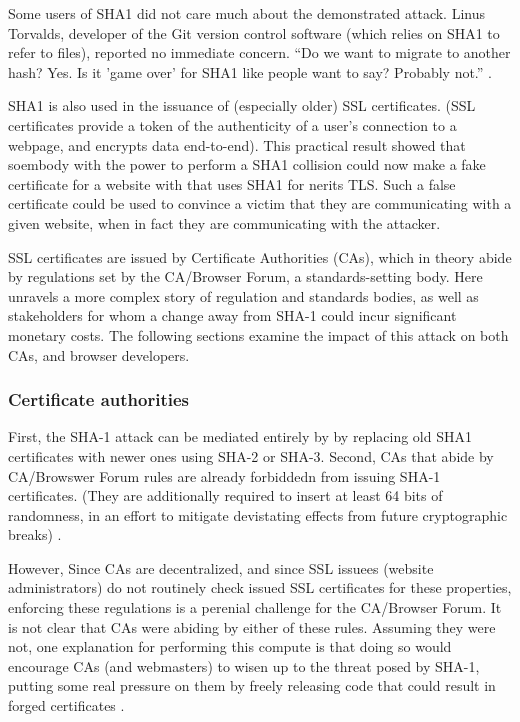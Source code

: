 \documentclass[sigconf]{acmart}
\begin{document}
Some users of SHA1 did not care much about the demonstrated attack.
Linus Torvalds, developer of the Git version control software (which relies on SHA1 to refer to files), reported no immediate concern.
``Do we want to migrate to another hash? Yes. Is it 'game over' for SHA1 like people want to say? Probably not.'' \cite{Torvalds2017}.

SHA1 is also used in the issuance of (especially older) SSL certificates.
(SSL certificates
provide a token of the authenticity of a user's connection to a webpage,
and encrypts data end-to-end).
This practical result showed that soembody with the power to perform a SHA1 collision could
now make a fake certificate for a website with that uses SHA1 for nerits TLS.
Such a false certificate could
be used to convince a victim that they are communicating with a given website,
when in fact they are communicating with the attacker.

SSL certificates are issued by Certificate Authorities (CAs), which in theory abide by 
regulations set by the CA/Browser Forum, a standards-setting body.
Here unravels a more complex story of regulation and standards bodies,
as well as stakeholders for whom a change away from SHA-1 could incur significant monetary costs.
The following sections examine the impact of this attack on both CAs, and browser developers. 

\subsubsection{Certificate authorities}
\label{sec:org8f8ea2c}

First, the SHA-1 attack can be mediated entirely by
by replacing old SHA1 certificates with newer ones using SHA-2 or SHA-3.
Second, CAs that abide by CA/Browswer Forum rules are already forbiddedn from issuing SHA-1 certificates. (They are additionally required to insert at least 64 bits of randomness, in an effort to mitigate devistating effects from future cryptographic breaks) \cite{Stevens2017}.

However, Since CAs are decentralized, and since SSL issuees (website administrators) do not routinely check issued SSL certificates for these properties, enforcing these regulations is a perenial challenge for the CA/Browser Forum. It is not clear that CAs were abiding by either of these rules.
Assuming they were not, one explanation for performing this compute is that doing so would encourage CAs (and webmasters) to wisen up to the threat posed by SHA-1,
putting some real pressure on them by freely releasing code that could result in forged certificates \cite{Stevens2017github}.
\end{document}
